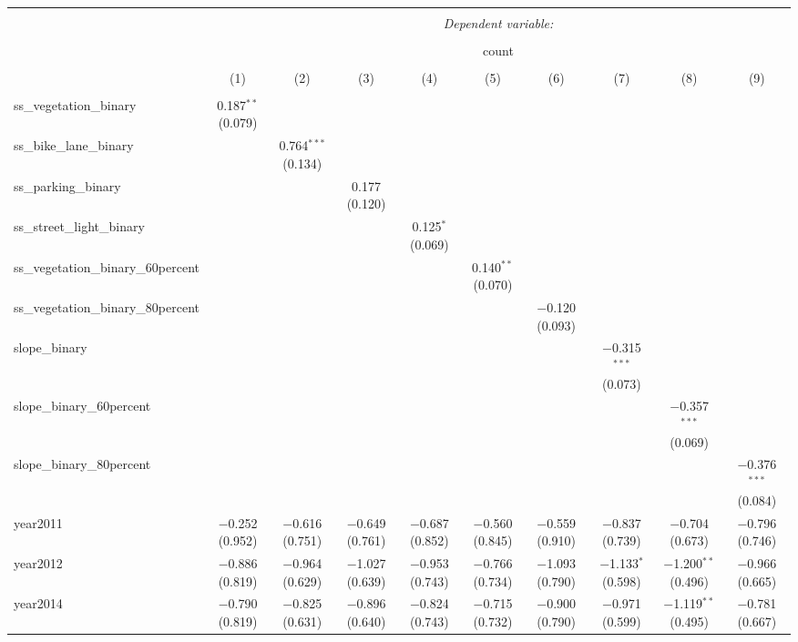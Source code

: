 
\begin{table}[!htbp] \centering 
  \caption{} 
  \label{} 
\small 
\begin{tabular}{@{\extracolsep{1pt}}lccccccccc} 
\\[-1.8ex]\hline 
\hline \\[-1.8ex] 
 & \multicolumn{9}{c}{\textit{Dependent variable:}} \\ 
\cline{2-10} 
\\[-1.8ex] & \multicolumn{9}{c}{count} \\ 
\\[-1.8ex] & (1) & (2) & (3) & (4) & (5) & (6) & (7) & (8) & (9)\\ 
\hline \\[-1.8ex] 
 ss\_vegetation\_binary & 0.187$^{**}$ (0.079) &  &  &  &  &  &  &  &  \\ 
  ss\_bike\_lane\_binary &  & 0.764$^{***}$ (0.134) &  &  &  &  &  &  &  \\ 
  ss\_parking\_binary &  &  & 0.177 (0.120) &  &  &  &  &  &  \\ 
  ss\_street\_light\_binary &  &  &  & 0.125$^{*}$ (0.069) &  &  &  &  &  \\ 
  ss\_vegetation\_binary\_60percent &  &  &  &  & 0.140$^{**}$ (0.070) &  &  &  &  \\ 
  ss\_vegetation\_binary\_80percent &  &  &  &  &  & $-$0.120 (0.093) &  &  &  \\ 
  slope\_binary &  &  &  &  &  &  & $-$0.315$^{***}$ (0.073) &  &  \\ 
  slope\_binary\_60percent &  &  &  &  &  &  &  & $-$0.357$^{***}$ (0.069) &  \\ 
  slope\_binary\_80percent &  &  &  &  &  &  &  &  & $-$0.376$^{***}$ (0.084) \\ 
  year2011 & $-$0.252 (0.952) & $-$0.616 (0.751) & $-$0.649 (0.761) & $-$0.687 (0.852) & $-$0.560 (0.845) & $-$0.559 (0.910) & $-$0.837 (0.739) & $-$0.704 (0.673) & $-$0.796 (0.746) \\ 
  year2012 & $-$0.886 (0.819) & $-$0.964 (0.629) & $-$1.027 (0.639) & $-$0.953 (0.743) & $-$0.766 (0.734) & $-$1.093 (0.790) & $-$1.133$^{*}$ (0.598) & $-$1.200$^{**}$ (0.496) & $-$0.966 (0.665) \\ 
  year2014 & $-$0.790 (0.819) & $-$0.825 (0.631) & $-$0.896 (0.640) & $-$0.824 (0.743) & $-$0.715 (0.732) & $-$0.900 (0.790) & $-$0.971 (0.599) & $-$1.119$^{**}$ (0.495) & $-$0.781 (0.667) \\ 

\end{tabular}
\end{table}
